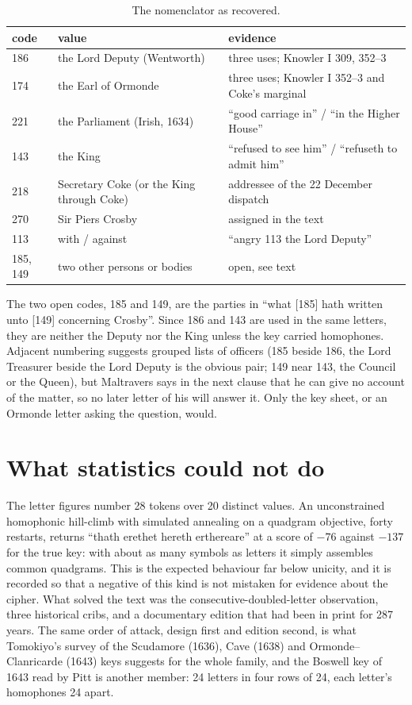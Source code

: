 \documentclass[11pt]{article}
\begin{document}
\begin{table}[t]
\centering\small
\begin{tabular}{@{}lll@{}}
\toprule
code & value & evidence \\
\midrule
186 & the Lord Deputy (Wentworth) & three uses; Knowler I 309, 352--3 \\
174 & the Earl of Ormonde & three uses; Knowler I 352--3 and Coke's marginal \\
221 & the Parliament (Irish, 1634) & ``good carriage in'' / ``in the Higher House'' \\
143 & the King & ``refused to see him'' / ``refuseth to admit him'' \\
218 & Secretary Coke (or the King through Coke) & addressee of the 22 December dispatch \\
270 & Sir Piers Crosby & assigned in the text \\
113 & with / against & ``angry 113 the Lord Deputy'' \\
185, 149 & two other persons or bodies & open, see text \\
\bottomrule
\end{tabular}
\caption{\label{tab:codes} The nomenclator as recovered.}
\end{table}

The two open codes, 185 and 149, are the parties in ``what [185] hath written unto [149] concerning Crosby''. Since 186 and 143 are used in the same letters, they are neither the Deputy nor the King unless the key carried homophones. Adjacent numbering suggests grouped lists of officers (185 beside 186, the Lord Treasurer beside the Lord Deputy is the obvious pair; 149 near 143, the Council or the Queen), but Maltravers says in the next clause that he can give no account of the matter, so no later letter of his will answer it. Only the key sheet, or an Ormonde letter asking the question, would.

\section{What statistics could not do}

The letter figures number 28 tokens over 20 distinct values. An unconstrained homophonic hill-climb with simulated annealing on a quadgram objective, forty restarts, returns ``thath erethet hereth erthereare'' at a score of $-76$ against $-137$ for the true key: with about as many symbols as letters it simply assembles common quadgrams. This is the expected behaviour far below unicity, and it is recorded so that a negative of this kind is not mistaken for evidence about the cipher. What solved the text was the consecutive-doubled-letter observation, three historical cribs, and a documentary edition that had been in print for 287 years. The same order of attack, design first and edition second, is what Tomokiyo's survey of the Scudamore (1636), Cave (1638) and Ormonde--Clanricarde (1643) keys suggests for the whole family, and the Boswell key of 1643 read by Pitt  is another member: 24 letters in four rows of 24, each letter's homophones 24 apart.
\end{document}
